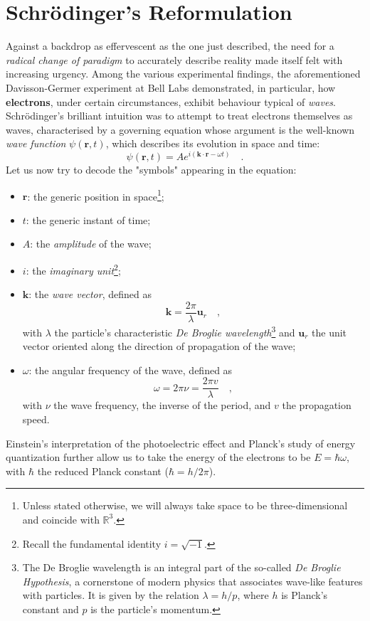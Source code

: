 \section{Schrödinger's Reformulation}
Against a backdrop as effervescent as the one just described, the need for a \emph{radical change of paradigm} to accurately describe reality made itself felt with increasing urgency. Among the various experimental findings, the aforementioned Davisson-Germer experiment at Bell Labs demonstrated, in particular, how \textbf{electrons}, under certain circumstances, exhibit behaviour typical of \emph{waves}. Schrödinger's brilliant intuition was to attempt to treat electrons themselves as waves, characterised by a governing equation whose argument is the well-known \emph{wave function} $\psi(\bm{r},t)$, which describes its evolution in space and time:
\begin{equation}
    \psi(\bm{r},t) = A e^{i(\bm{k}\cdot\bm{r}- \omega t)} \quad.
    \label{eq:func_onda}
\end{equation}
Let us now try to decode the "symbols" appearing in the equation:
\begin{itemize}[noitemsep]
    \item $\bm{r}$: the generic position in space\footnote{Unless stated otherwise, we will always take space to be three-dimensional and coincide with $\mathbb{R}^3$.};
    \item $t$: the generic instant of time;
    \item $A$: the \emph{amplitude} of the wave;
    \item $i$: the \emph{imaginary unit}\footnote{Recall the fundamental identity $i = \sqrt{-1}$.};
    \item $\bm{k}$: the \emph{wave vector}, defined as
    \[
        \bm{k} = \frac{2\pi}{\lambda} \bm{{u}}_r \quad,
    \]
    with $\lambda$ the particle's characteristic \emph{De Broglie wavelength}\footnote{The De Broglie wavelength is an integral part of the so-called \emph{De Broglie Hypothesis}, a cornerstone of modern physics that associates wave-like features with particles. It is given by the relation $\lambda = {h}/{p}$, where $h$ is Planck's constant and $p$ is the particle's momentum.} and $\bm{{u}}_r$ the unit vector oriented along the direction of propagation of the wave;
    \item $\omega$: the angular frequency of the wave, defined as
    \[
        \omega = 2\pi\nu = \frac{2\pi v}{\lambda} \quad,
    \]
    with $\nu$ the wave frequency, the inverse of the period, and $v$ the propagation speed.
\end{itemize}
Einstein's interpretation of the photoelectric effect and Planck's study of energy quantization further allow us to take the energy of the electrons to be $E = \hbar \omega$, with $\hbar$ the reduced Planck constant ($\hbar = h/2\pi$).

